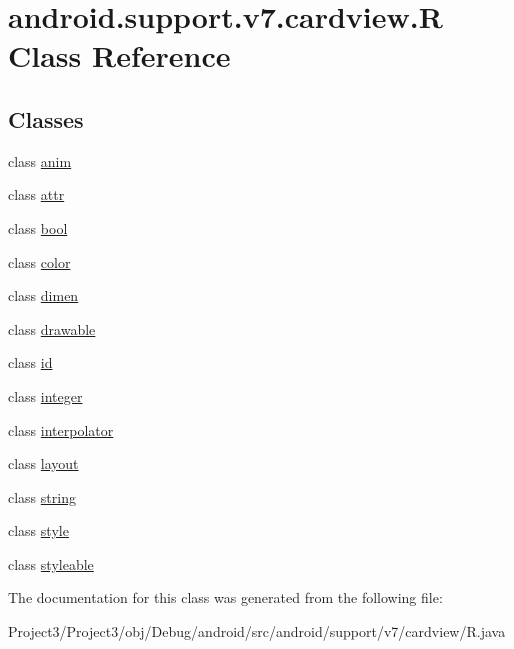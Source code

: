 \hypertarget{classandroid_1_1support_1_1v7_1_1cardview_1_1R}{}\section{android.\+support.\+v7.\+cardview.\+R Class Reference}
\label{classandroid_1_1support_1_1v7_1_1cardview_1_1R}
\subsection*{Classes}
\begin{DoxyCompactItemize}
\item 
class \hyperlink{classandroid_1_1support_1_1v7_1_1cardview_1_1R_1_1anim}{anim}
\item 
class \hyperlink{classandroid_1_1support_1_1v7_1_1cardview_1_1R_1_1attr}{attr}
\item 
class \hyperlink{classandroid_1_1support_1_1v7_1_1cardview_1_1R_1_1bool}{bool}
\item 
class \hyperlink{classandroid_1_1support_1_1v7_1_1cardview_1_1R_1_1color}{color}
\item 
class \hyperlink{classandroid_1_1support_1_1v7_1_1cardview_1_1R_1_1dimen}{dimen}
\item 
class \hyperlink{classandroid_1_1support_1_1v7_1_1cardview_1_1R_1_1drawable}{drawable}
\item 
class \hyperlink{classandroid_1_1support_1_1v7_1_1cardview_1_1R_1_1id}{id}
\item 
class \hyperlink{classandroid_1_1support_1_1v7_1_1cardview_1_1R_1_1integer}{integer}
\item 
class \hyperlink{classandroid_1_1support_1_1v7_1_1cardview_1_1R_1_1interpolator}{interpolator}
\item 
class \hyperlink{classandroid_1_1support_1_1v7_1_1cardview_1_1R_1_1layout}{layout}
\item 
class \hyperlink{classandroid_1_1support_1_1v7_1_1cardview_1_1R_1_1string}{string}
\item 
class \hyperlink{classandroid_1_1support_1_1v7_1_1cardview_1_1R_1_1style}{style}
\item 
class \hyperlink{classandroid_1_1support_1_1v7_1_1cardview_1_1R_1_1styleable}{styleable}
\end{DoxyCompactItemize}


The documentation for this class was generated from the following file\+:\begin{DoxyCompactItemize}
\item 
Project3/\+Project3/obj/\+Debug/android/src/android/support/v7/cardview/R.\+java\end{DoxyCompactItemize}
